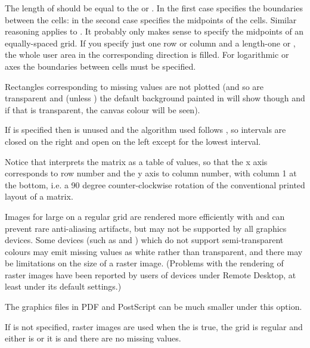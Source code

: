 %
\begin{Details}\relax
The length of  should be equal to the  or
.  In the first case  specifies the boundaries
between the cells: in the second case  specifies the midpoints
of the cells.  Similar reasoning applies to .  It probably
only makes sense to specify the midpoints of an equally-spaced
grid.  If you specify just one row or column and a length-one 
or , the whole user area in the corresponding direction is
filled. For logarithmic  or  axes the boundaries between 
cells must be specified.

Rectangles corresponding to missing values are not plotted (and so are
transparent and (unless ) the default background painted
in  will show though and if that is transparent, the
canvas colour will be seen).

If  is specified then  is unused and the
algorithm used follows , so intervals are closed on
the right and open on the left except for the lowest interval.

Notice that  interprets the  matrix as a table of
 values, so that the x axis corresponds to row
number and the y axis to column number, with column 1 at the bottom,
i.e. a 90 degree counter-clockwise rotation of the conventional
printed layout of a matrix.

Images for large  on a regular grid are rendered more
efficiently with  and can prevent rare
anti-aliasing artifacts, but may not be supported by all graphics
devices.  Some devices (such as  and ) which do not support semi-transparent colours may emit
missing values as white rather than transparent, and there may be
limitations on the size of a raster image.  (Problems with the
rendering of raster images have been reported by users of
 devices under Remote Desktop, at least under its
default settings.)

The graphics files in PDF and PostScript can be much smaller under
this option.

If  is not specified, raster images are used when the
 is true, the grid is regular
and either  is  or
it is  and there are no missing values.
\end{Details}
